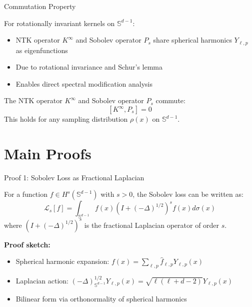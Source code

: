 \documentclass{beamer}
\begin{document}
\begin{frame}{Commutation Property}
\begin{theorem}
For rotationally invariant kernels on $\mathbb{S}^{d-1}$:
\begin{itemize}
\item NTK operator $K^{\infty}$ and Sobolev operator $P_s$ share spherical harmonics $Y_{\ell,p}$ as eigenfunctions
\item Due to rotational invariance and Schur's lemma
\item Enables direct spectral modification analysis
\end{itemize}
\end{theorem}

\begin{theorem}
The NTK operator $K^{\infty}$ and Sobolev operator $P_s$ commute:
\[ [K^{\infty}, P_s] = 0 \]
This holds for any sampling distribution $\rho(x)$ on $\mathbb{S}^{d-1}$.
\end{theorem}
\end{frame}

\section{Main Proofs}

\begin{frame}{Proof 1: Sobolev Loss as Fractional Laplacian}
\begin{theorem}
For a function $f \in H^s(\mathbb{S}^{d-1})$ with $s > 0$, the Sobolev loss can be written as:
\[ \mathcal{L}_s[f] = \int_{\mathbb{S}^{d-1}} f(x) (I + (-\Delta)^{1/2})^s f(x) d\sigma(x) \]
where $(I + (-\Delta)^{1/2})^s$ is the fractional Laplacian operator of order $s$.
\end{theorem}

\textbf{Proof sketch:}
\begin{itemize}
\item Spherical harmonic expansion: $f(x) = \sum_{\ell,p} \hat{f}_{\ell,p} Y_{\ell,p}(x)$
\item Laplacian action: $(-\Delta)^{1/2}_{\mathbb{S}^{d-1}} Y_{\ell,p}(x) = \sqrt{\ell(\ell + d - 2)} Y_{\ell,p}(x)$
\item Bilinear form via orthonormality of spherical harmonics
\end{itemize}
\end{frame}
\end{document}

